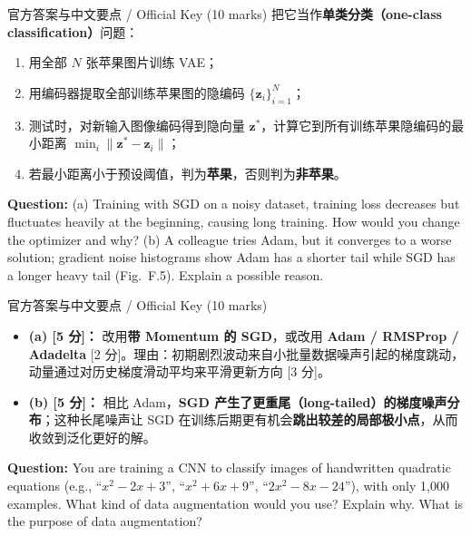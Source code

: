 \begin{StudySolution}{官方答案与中文要点 / Official Key (10 marks)}
把它当作\textbf{单类分类（one-class classification）}问题：
\begin{enumerate}
\item 用全部 $N$ 张苹果图片训练 VAE；
\item 用编码器提取全部训练苹果图的隐编码 $\{\mathbf{z}_i\}_{i=1}^N$；
\item 测试时，对新输入图像编码得到隐向量 $\mathbf{z}^*$，计算它到所有训练苹果隐编码的最小距离 $\min_i \|\mathbf{z}^* - \mathbf{z}_i\|$；
\item 若最小距离小于预设阈值，判为\textbf{苹果}，否则判为\textbf{非苹果}。
\end{enumerate}
\end{StudySolution}

\textbf{Question:} (a) Training with SGD on a noisy dataset, training loss decreases but fluctuates heavily at the beginning, causing long training. How would you change the optimizer and why? (b) A colleague tries Adam, but it converges to a worse solution; gradient noise histograms show Adam has a shorter tail while SGD has a longer heavy tail (Fig.~F.5). Explain a possible reason.


\begin{StudySolution}{官方答案与中文要点 / Official Key (10 marks)}
\begin{itemize}
\item \textbf{(a) [5 分]：} 改用\textbf{带 Momentum 的 SGD}，或改用 \textbf{Adam / RMSProp / Adadelta} [2 分]。理由：初期剧烈波动来自小批量数据噪声引起的梯度跳动，动量通过对历史梯度滑动平均来平滑更新方向 [3 分]。
\item \textbf{(b) [5 分]：} 相比 Adam，\textbf{SGD 产生了更重尾（long-tailed）的梯度噪声分布}；这种长尾噪声让 SGD 在训练后期更有机会\textbf{跳出较差的局部极小点}，从而收敛到泛化更好的解。
\end{itemize}
\end{StudySolution}

\textbf{Question:} You are training a CNN to classify images of handwritten quadratic equations (e.g., ``$x^2-2x+3$'', ``$x^2+6x+9$'', ``$2x^2-8x-24$''), with only 1,000 examples. What kind of data augmentation would you use? Explain why. What is the purpose of data augmentation?

